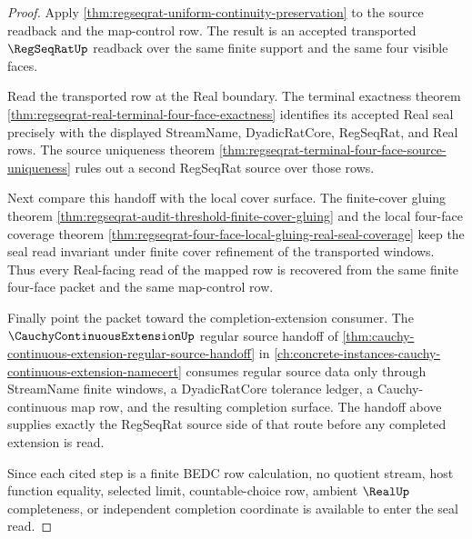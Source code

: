 \begin{proof}
Apply
\autoref{thm:regseqrat-uniform-continuity-preservation} to the source
readback and the map-control row. The result is an accepted transported
$\RegSeqRatUp$ readback over the same finite support and the same four visible
faces.

Read the transported row at the Real boundary. The terminal exactness theorem
\autoref{thm:regseqrat-real-terminal-four-face-exactness} identifies its
accepted Real seal precisely with the displayed StreamName, DyadicRatCore,
RegSeqRat, and Real rows. The source uniqueness theorem
\autoref{thm:regseqrat-terminal-four-face-source-uniqueness} rules out a
second RegSeqRat source over those rows.

Next compare this handoff with the local cover surface. The finite-cover
gluing theorem
\autoref{thm:regseqrat-audit-threshold-finite-cover-gluing} and the local
four-face coverage theorem
\autoref{thm:regseqrat-four-face-local-gluing-real-seal-coverage} keep the
seal read invariant under finite cover refinement of the transported windows.
Thus every Real-facing read of the mapped row is recovered from the same
finite four-face packet and the same map-control row.

Finally point the packet toward the completion-extension consumer. The
$\CauchyContinuousExtensionUp$ regular source handoff of
\autoref{thm:cauchy-continuous-extension-regular-source-handoff} in
\autoref{ch:concrete-instances-cauchy-continuous-extension-namecert} consumes
regular source data only through StreamName finite windows, a DyadicRatCore
tolerance ledger, a Cauchy-continuous map row, and the resulting completion
surface. The handoff above supplies exactly the RegSeqRat source side of that
route before any completed extension is read.

Since each cited step is a finite BEDC row calculation, no quotient stream,
host function equality, selected limit, countable-choice row, ambient
$\RealUp$ completeness, or independent completion coordinate is available to
enter the seal read.
\end{proof}

